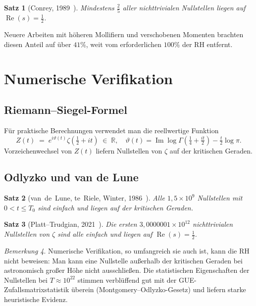 \documentclass[12pt,a4paper]{article}
\newtheorem{theorem}{Satz}[section]
\theoremstyle{remark}
\newtheorem{bemerkung}[theorem]{Bemerkung}
\begin{document}
\begin{theorem}[Conrey, 1989~\cite{Conrey1989}]
  Mindestens $\tfrac{2}{5}$ aller nichttrivialen Nullstellen liegen auf
  $\operatorname{Re}(s)=\tfrac{1}{2}$.
\end{theorem}

Neuere Arbeiten mit höheren Mollifiern und verschobenen Momenten brachten diesen Anteil
auf über $41\%$, weit vom erforderlichen $100\%$ der RH entfernt.

\section{Numerische Verifikation}

\subsection{Riemann--Siegel-Formel}

Für praktische Berechnungen verwendet man die reellwertige Funktion
\[
  Z(t) \;=\; e^{i\vartheta(t)}\zeta\!\left(\tfrac{1}{2}+it\right) \;\in\;\mathbb{R},
  \quad
  \vartheta(t) = \operatorname{Im}\log\Gamma\!\left(\tfrac{1}{4}+\tfrac{it}{2}\right)
                 - \tfrac{t}{2}\log\pi.
\]
Vorzeichenwechsel von $Z(t)$ liefern Nullstellen von $\zeta$ auf der kritischen Geraden.

\subsection{Odlyzko und van de Lune}

\begin{theorem}[van~de~Lune, te~Riele, Winter, 1986~\cite{vanDeLune1986}]
  Alle $1{,}5\times10^9$ Nullstellen mit $0<t\leq T_0$ sind einfach und liegen auf der
  kritischen Geraden.
\end{theorem}

\begin{theorem}[Platt--Trudgian, 2021~\cite{PlattTrudgian2021}]
  Die ersten $3{,}0000001\times10^{12}$ nichttrivialen Nullstellen von $\zeta$ sind
  alle einfach und liegen auf $\operatorname{Re}(s)=\tfrac{1}{2}$.
\end{theorem}

\begin{bemerkung}
  Numerische Verifikation, so umfangreich sie auch ist, kann die RH nicht beweisen:
  Man kann eine Nullstelle außerhalb der kritischen Geraden bei astronomisch großer Höhe
  nicht ausschließen.  Die statistischen Eigenschaften der Nullstellen bei
  $T\approx10^{22}$ stimmen verblüffend gut mit der GUE-Zufallsmatrixstatistik überein
  (Montgomery--Odlyzko-Gesetz) und liefern starke heuristische Evidenz.
\end{bemerkung}
\end{document}
